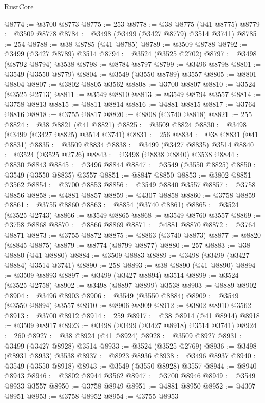 \begin{lexlean}{RustCore}
\begin{coremodule}
@8774 := @3700 @8773
@8775 := 253
@8778 := @38 @8775 (@41 @8775)
@8779 := @3509 @8778
@8784 := @3498 (@3499 (@3427 @8779) @3514 @3741)
@8785 := 254
@8788 := @38 @8785 (@41 @8785)
@8789 := @3509 @8788
@8792 := @3499 (@3427 @8789) @3514
@8794 := @3524 (@3525 @2702)
@8797 := @3498 (@8792 @8794) @3538
@8798 := @8784 @8797
@8799 := @3496 @8798
@8801 := @3549 (@3550 @8779)
@8804 := @3549 (@3550 @8789) @3557
@8805 := @8801 @8804
@8807 := @3802 @8805 @3562
@8808 := @3700 @8807
@8810 := @3524 (@3525 @2713)
@8811 := @3549 @8810
@8813 := @3549 @8794 @3557
@8814 := @3758 @8813
@8815 := @8811 @8814
@8816 := @4881 @8815
@8817 := @3764 @8816
@8818 := @3755 @8817
@8820 := @8808 (@3740 @8818)
@8821 := 255
@8824 := @38 @8821 (@41 @8821)
@8825 := @3509 @8824
@8830 := @3498 (@3499 (@3427 @8825) @3514 @3741)
@8831 := 256
@8834 := @38 @8831 (@41 @8831)
@8835 := @3509 @8834
@8838 := @3499 (@3427 @8835) @3514
@8840 := @3524 (@3525 @2726)
@8843 := @3498 (@8838 @8840) @3538
@8844 := @8830 @8843
@8845 := @3496 @8844
@8847 := @3549 (@3550 @8825)
@8850 := @3549 (@3550 @8835) @3557
@8851 := @8847 @8850
@8853 := @3802 @8851 @3562
@8854 := @3700 @8853
@8856 := @3549 @8840 @3557
@8857 := @3758 @8856
@8858 := @4881 @8857
@8859 := @4307 @8858
@8860 := @3758 @8859
@8861 := @3755 @8860
@8863 := @8854 (@3740 @8861)
@8865 := @3524 (@3525 @2743)
@8866 := @3549 @8865
@8868 := @3549 @8760 @3557
@8869 := @3758 @8868
@8870 := @8866 @8869
@8871 := @4881 @8870
@8872 := @3764 @8871
@8873 := @3755 @8872
@8875 := @8863 (@3740 @8873)
@8877 := @8820 (@8845 @8875)
@8879 := @8774 (@8799 @8877)
@8880 := 257
@8883 := @38 @8880 (@41 @8880)
@8884 := @3509 @8883
@8889 := @3498 (@3499 (@3427 @8884) @3514 @3741)
@8890 := 258
@8893 := @38 @8890 (@41 @8890)
@8894 := @3509 @8893
@8897 := @3499 (@3427 @8894) @3514
@8899 := @3524 (@3525 @2758)
@8902 := @3498 (@8897 @8899) @3538
@8903 := @8889 @8902
@8904 := @3496 @8903
@8906 := @3549 (@3550 @8884)
@8909 := @3549 (@3550 @8894) @3557
@8910 := @8906 @8909
@8912 := @3802 @8910 @3562
@8913 := @3700 @8912
@8914 := 259
@8917 := @38 @8914 (@41 @8914)
@8918 := @3509 @8917
@8923 := @3498 (@3499 (@3427 @8918) @3514 @3741)
@8924 := 260
@8927 := @38 @8924 (@41 @8924)
@8928 := @3509 @8927
@8931 := @3499 (@3427 @8928) @3514
@8933 := @3524 (@3525 @2769)
@8936 := @3498 (@8931 @8933) @3538
@8937 := @8923 @8936
@8938 := @3496 @8937
@8940 := @3549 (@3550 @8918)
@8943 := @3549 (@3550 @8928) @3557
@8944 := @8940 @8943
@8946 := @3802 @8944 @3562
@8947 := @3700 @8946
@8949 := @3549 @8933 @3557
@8950 := @3758 @8949
@8951 := @4881 @8950
@8952 := @4307 @8951
@8953 := @3758 @8952
@8954 := @3755 @8953

\end{coremodule}
\end{lexlean}
